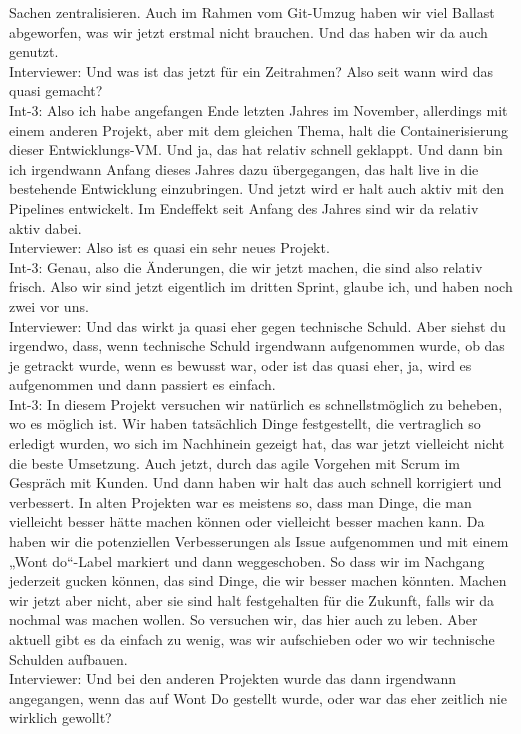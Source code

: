 Sachen zentralisieren. Auch im Rahmen vom Git-Umzug haben wir viel Ballast abgeworfen, was wir jetzt erstmal nicht brauchen. Und das haben wir da auch genutzt. \\
Interviewer: Und was ist das jetzt für ein Zeitrahmen? Also seit wann wird das quasi gemacht? \\
Int-3: Also ich habe angefangen Ende letzten Jahres im November, allerdings mit einem anderen Projekt, aber mit dem gleichen Thema, halt die Containerisierung dieser Entwicklungs-VM. Und ja, das hat relativ schnell geklappt. Und dann bin ich irgendwann Anfang dieses Jahres dazu übergegangen, das halt live in die bestehende Entwicklung einzubringen. Und jetzt wird er halt auch aktiv mit den Pipelines entwickelt. Im Endeffekt seit Anfang des Jahres sind wir da relativ aktiv dabei. \\
Interviewer: Also ist es quasi ein sehr neues Projekt. \\
Int-3: Genau, also die Änderungen, die wir jetzt machen, die sind also relativ frisch. Also wir sind jetzt eigentlich im dritten Sprint, glaube ich, und haben noch zwei vor uns.\\
Interviewer: Und das wirkt ja quasi eher gegen technische Schuld. Aber siehst du irgendwo, dass, wenn technische Schuld irgendwann aufgenommen wurde, ob das je getrackt wurde, wenn es bewusst war, oder ist das quasi eher, ja, wird es aufgenommen und dann passiert es einfach.\\
Int-3: In diesem Projekt versuchen wir natürlich es schnellstmöglich zu beheben, wo es möglich ist. Wir haben tatsächlich Dinge festgestellt, die vertraglich so erledigt wurden, wo sich im Nachhinein gezeigt hat, das war jetzt vielleicht nicht die beste Umsetzung. Auch jetzt, durch das agile Vorgehen mit Scrum im Gespräch mit Kunden. Und dann haben wir halt das auch schnell korrigiert und verbessert. In alten Projekten war es meistens so, dass man Dinge, die man vielleicht besser hätte machen können oder vielleicht besser machen kann. Da haben wir die potenziellen Verbesserungen als Issue aufgenommen und mit einem „Wont do“-Label markiert und dann weggeschoben. So dass wir im Nachgang jederzeit gucken können, das sind Dinge, die wir besser machen könnten. Machen wir jetzt aber nicht, aber sie sind halt festgehalten für die Zukunft, falls wir da nochmal was machen wollen. So versuchen wir, das hier auch zu leben. Aber aktuell gibt es da einfach zu wenig, was wir aufschieben oder wo wir technische Schulden aufbauen. \\
Interviewer: Und bei den anderen Projekten wurde das dann irgendwann angegangen, wenn das auf Wont Do gestellt wurde, oder war das eher zeitlich nie wirklich gewollt?\\
